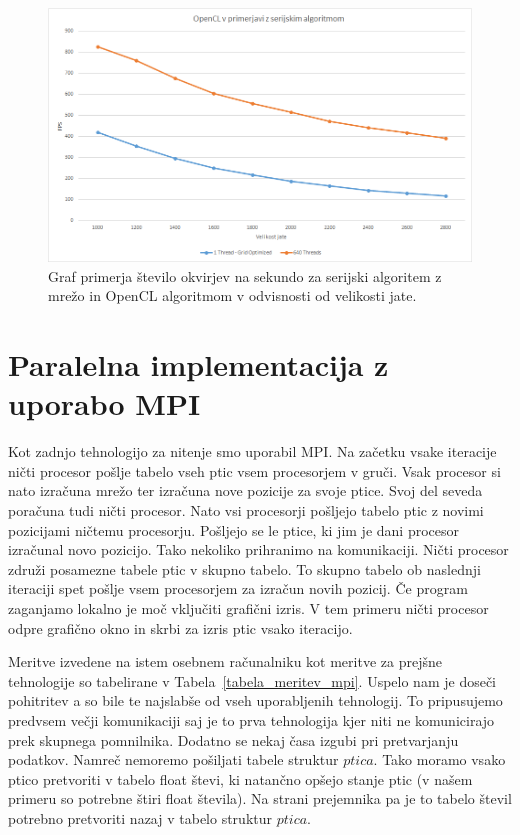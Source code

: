 \documentclass[a4paper, 12pt]{book}
\begin{document}
\begin{figure}[]
\includegraphics[width=\textwidth]{graf_opencl}
\caption{Graf primerja število okvirjev na sekundo za serijski algoritem z mrežo in OpenCL algoritmom v odvisnosti od velikosti jate.}
\label{img:graf_opencl}
\centering
\end{figure}

\chapter{Paralelna implementacija z uporabo MPI}
\label{ch5}
Kot zadnjo tehnologijo za nitenje smo uporabil MPI. Na začetku vsake iteracije ničti procesor pošlje tabelo vseh ptic vsem procesorjem v gruči. Vsak procesor si nato izračuna mrežo ter izračuna nove pozicije za svoje ptice. Svoj del seveda poračuna tudi ničti procesor. Nato vsi procesorji pošljejo tabelo ptic z novimi pozicijami ničtemu procesorju. Pošljejo se le ptice, ki jim je dani procesor izračunal novo pozicijo. Tako nekoliko prihranimo na komunikaciji. Ničti procesor združi posamezne tabele ptic v skupno tabelo. To skupno tabelo ob naslednji iteraciji spet pošlje vsem procesorjem za izračun novih pozicij. Če program zaganjamo lokalno je moč vključiti grafični izris. V tem primeru ničti procesor odpre grafično okno in skrbi za izris ptic vsako iteracijo.

Meritve izvedene na istem osebnem računalniku kot meritve za prejšne tehnologije so tabelirane v Tabela~\ref{tabela_meritev_mpi}. Uspelo nam je doseči pohitritev a so bile te najslabše od vseh uporabljenih tehnologij. To pripusujemo predvsem večji komunikaciji saj je to prva tehnologija kjer niti ne komunicirajo prek skupnega pomnilnika. Dodatno se nekaj časa izgubi pri pretvarjanju podatkov. Namreč nemoremo pošiljati tabele struktur $ptica$. Tako moramo vsako ptico pretvoriti v tabelo float števi, ki natančno opšejo stanje ptic (v našem primeru so potrebne štiri float števila). Na strani prejemnika pa je to tabelo števil potrebno pretvoriti nazaj v tabelo struktur $ptica$.
\end{document}
